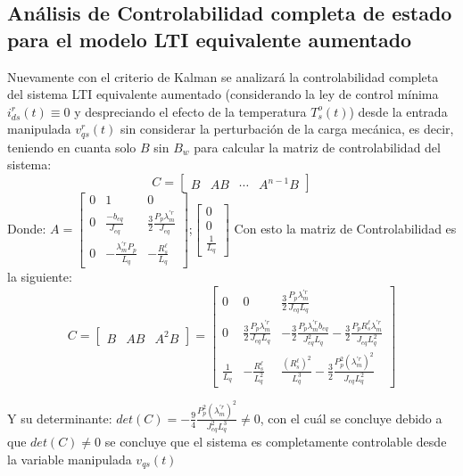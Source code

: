 \documentclass[blue,fullpaper]{ludusofficial}  %
\begin{document}
\subsection{Análisis de Controlabilidad completa de estado para el modelo LTI equivalente aumentado }
Nuevamente con el criterio de Kalman se analizará la controlabilidad completa del sistema LTI equivalente aumentado (considerando la ley de control mínima $i_{ds}^{r}(t) \equiv 0$  y despreciando el efecto de la temperatura $T_{s}^{o}(t)$) desde la entrada manipulada $v_{qs}^r(t)$ sin considerar la perturbación de la carga mecánica, es decir, teniendo en cuanta solo $B$ sin $B_w$ para calcular la matriz de controlabilidad del sistema:
\begin{equation}
\label{eq:controlabilidad-kalman}
    C = \begin{bmatrix} B & AB & \cdots & A^{n-1}B \end{bmatrix}
\end{equation}
Donde: $
A = \begin{bmatrix}
0 & 1 & 0 \\
0 & \frac{-b_{eq}}{J_{eq}} & \frac{3}{2}\frac{P_p\lambda_{m}^{'r}}{J_{eq}} \\
0 & -\frac{\lambda^{'r}_{m}P_p}{L_q} & -\frac{R^\ell_s}{L_q}
\end{bmatrix}
$;$\begin{bmatrix}
0 \\
 0\\
 \frac{1}{L_q}
\end{bmatrix}$
Con esto la matriz de Controlabilidad es la siguiente: 
\begin{equation}
\label{eq:controlabilidad-lti}
C = \begin{bmatrix} B & AB & A^2B \end{bmatrix} = \begin{bmatrix}
0 & 0 & \frac{3}{2}\frac{P_p \lambda_{m}^{'r}}{J_{eq} L_{q}} \\
0 & \frac{3}{2}\frac{P_p \lambda_{m}^{'r}}{J_{eq} L_{q}} & -\frac{3}{2}\frac{P_p \lambda_{m}^{'r} b_{eq}}{J_{eq}^2 L_{q}} - \frac{3}{2}\frac{P_p R^\ell_s \lambda_{m}^{'r}}{J_{eq} L_{q}^2} \\
\frac{1}{L_{q}} & -\frac{R^\ell_s}{L_{q}^2} & \frac{(R^\ell_s)^{2}}{L_{q}^3} - \frac{3}{2}\frac{P_p^{2} (\lambda_{m}^{'r})^{2}}{J_{eq} L_{q}^2}\end{bmatrix}
\end{equation}

Y su determinante: $det(C)=-\frac{9}{4} \frac{P_p^2 (\lambda_{m}^{'r})^2}{J_{eq}^2 L_q^3}\neq 0$, con el cuál se concluye debido a que $det(C) \neq 0$ se concluye que el sistema es completamente controlable desde la variable manipulada $v_{qs}(t)$
\end{document}
